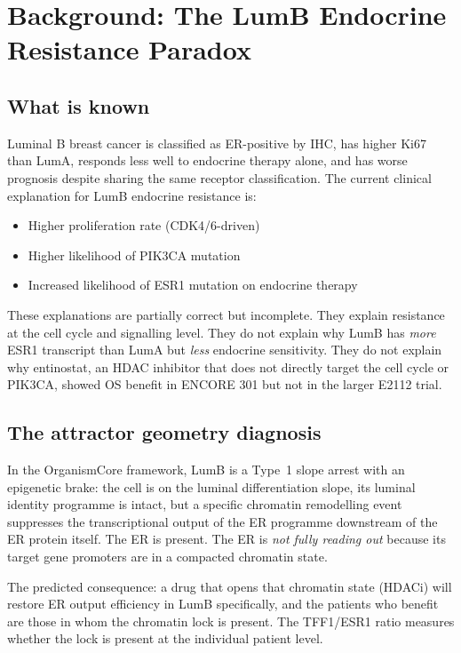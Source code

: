 \documentclass[12pt, a4paper]{article}
\begin{document}
\section{Background: The LumB Endocrine Resistance Paradox}

\subsection{What is known}

Luminal B breast cancer is classified as ER-positive
by IHC, has higher Ki67 than LumA, responds less
well to endocrine therapy alone, and has worse
prognosis despite sharing the same receptor
classification. The current clinical explanation for
LumB endocrine resistance is:
\begin{itemize}[noitemsep]
  \item Higher proliferation rate (CDK4/6-driven)
  \item Higher likelihood of PIK3CA mutation
  \item Increased likelihood of ESR1 mutation on
        endocrine therapy
\end{itemize}

\noindent
These explanations are partially correct but
incomplete. They explain resistance at the cell
cycle and signalling level. They do not explain why
LumB has \textit{more} ESR1 transcript than LumA
but \textit{less} endocrine sensitivity. They do
not explain why entinostat, an HDAC inhibitor that
does not directly target the cell cycle or PIK3CA,
showed OS benefit in ENCORE 301 but not in the
larger E2112 trial.

\subsection{The attractor geometry diagnosis}

In the OrganismCore framework, LumB is a Type~1
slope arrest with an epigenetic brake: the cell is
on the luminal differentiation slope, its luminal
identity programme is intact, but a specific chromatin
remodelling event suppresses the transcriptional
output of the ER programme downstream of the ER
protein itself. The ER is present. The ER is
\textit{not fully reading out} because its target
gene promoters are in a compacted chromatin state.

\noindent
The predicted consequence: a drug that opens that
chromatin state (HDACi) will restore ER output
efficiency in LumB specifically, and the patients
who benefit are those in whom the chromatin lock
is present. The TFF1/ESR1 ratio measures whether
the lock is present at the individual patient level.
\end{document}
